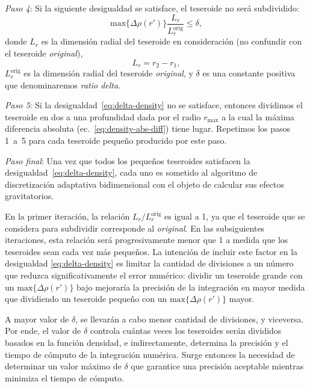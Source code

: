 \textit{Paso 4}:
Si la siguiente desigualdad se satisface, el teseroide no será subdividido:
%
\begin{equation}
    \text{max}\{ \Delta \rho(r') \} \frac{L_r}{L_r^\text{orig}} \le \delta,
    \label{eq:delta-density}
\end{equation}
%
donde $L_r$ es la dimensión radial del teseroide en consideración
(no confundir con el teseroide \emph{original}),
%
\begin{equation}
    L_r = r_2 - r_1,
\end{equation}
%
$L_r^\text{orig}$ es la dimensión radial del teseroide
\emph{original}, y $\delta$ es una constante positiva que denominaremos
\emph{ratio delta}.

\textit{Paso 5}:
Si la desigualdad~\ref{eq:delta-density} no se satisface, entonces dividimos el
teseroide en dos a una profundidad dada por el radio $r_\text{max}$ a la cual
la máxima diferencia absoluta (ec.~\ref{eq:density-abs-diff}) tiene lugar.
Repetimos los pasos 1~a~5 para cada teseroide pequeño producido por este paso.

\textit{Paso final}:
Una vez que todos los pequeños teseroides satisfacen la
desigualdad~\ref{eq:delta-density}, cada uno es sometido al algoritmo de
discretización adaptativa bidimensional con el objeto de calcular sus efectos
gravitatorios.

En la primer iteración, la relación $L_r/L_r^\text{orig}$ es igual a 1, ya que
el teseroide que se considera para subdividir corresponde al \emph{original}.
En las subsiguientes iteraciones, esta relación será progresivamente menor que
1 a medida que los teseroides sean cada vez más pequeños.
La intención de incluir este factor en la desigualdad \ref{eq:delta-density} es
limitar la cantidad de divisiones a un número que reduzca significativamente el
error numérico: dividir un teseroide grande con un $\text{max}\{ \Delta
\rho(r') \}$ bajo mejoraría la precisión de la integración en mayor medida que
dividiendo un teseroide pequeño con un $\text{max}\{ \Delta \rho(r') \}$
mayor.

A mayor valor de $\delta$, se llevarán a cabo menor cantidad de divisiones,
y viceversa.
Por ende, el valor de $\delta$ controla cuántas veces los teseroides serán
divididos basados en la función densidad, e indirectamente, determina la
precisión y el tiempo de cómputo de la integración numérica.
Surge entonces la necesidad de determinar un valor máximo de $\delta$ que
garantice una precisión aceptable mientras minimiza el tiempo de cómputo.


